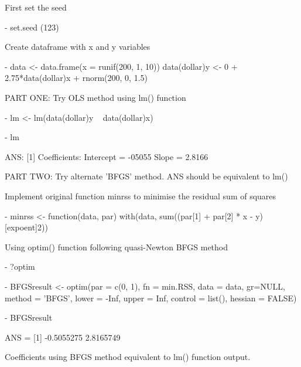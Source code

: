 \documentclass[12pt,letterpaper]{article}
\begin{document}
First set the seed 

	- set.seed (123)
	\vspace{.5cm}

Create dataframe with x and y variables

	- data <- data.frame(x = runif(200, 1, 10)) 
	data(dollar)y <- 0 + 2.75*data(dollar)x + rnorm(200, 0, 1.5)
\vspace{.5cm}

PART ONE: Try OLS method using lm() function

	- lm <- lm(data(dollar)y ~ data(dollar)x)
	
	- lm
	
ANS: [1] Coefficients: Intercept = -05055  Slope = 2.8166
 
\vspace{.5cm}
PART TWO: Try alternate 'BFGS' method. ANS should be equivalent to lm()

Implement original function minrss to minimise the residual sum of squares

	- minrss <- function(data, par) { 
	with(data, sum((par[1] + par[2] * x - y)[expoent]2))
	}

Using optim() function following quasi-Newton BFGS method 
	
\vspace{.2cm}
	- ?optim
	
	- BFGSresult <- optim(par = c(0, 1), fn = min.RSS, data = data, gr=NULL, method = 'BFGS', lower = -Inf, upper = Inf, control = list(), hessian = FALSE)
	
	- BFGSresult
\vspace{.2cm}

ANS = [1] -0.5055275  2.8165749

Coefficients using BFGS method equivalent to lm() function output. 
\end{document}
